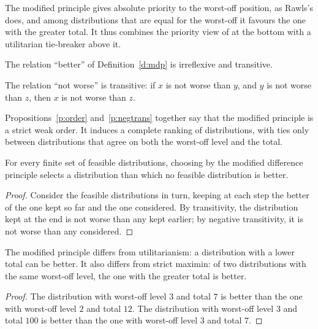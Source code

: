 \documentclass{situationist-preprint}
\begin{document}
The modified principle gives absolute priority to the worst-off position, as Rawls's does, and among distributions that are equal for the worst-off it favours the one with the greater total. It thus combines the priority view of \citet{Parfit1997} at the bottom with a utilitarian tie-breaker above it.

\begin{proposition}\label{p:order}
The relation \enquote{better} of Definition~\ref{d:mdp} is irreflexive and transitive.
\end{proposition}

\begin{proposition}\label{p:negtrans}
The relation \enquote{not worse} is transitive: if $x$ is not worse than $y$, and $y$ is not worse than $z$, then $x$ is not worse than $z$.
\end{proposition}

Propositions~\ref{p:order} and~\ref{p:negtrans} together say that the modified principle is a strict weak order. It induces a complete ranking of distributions, with ties only between distributions that agree on both the worst-off level and the total.

\begin{theorem}\label{t:choice}
For every finite set of feasible distributions, choosing by the modified difference principle selects a distribution than which no feasible distribution is better.
\end{theorem}

\begin{proof}
Consider the feasible distributions in turn, keeping at each step the better of the one kept so far and the one considered. By transitivity, the distribution kept at the end is not worse than any kept earlier; by negative transitivity, it is not worse than any considered.
\end{proof}

\begin{proposition}\label{p:differs}
The modified principle differs from utilitarianism: a distribution with a lower total can be better. It also differs from strict maximin: of two distributions with the same worst-off level, the one with the greater total is better.
\end{proposition}

\begin{proof}
The distribution with worst-off level $3$ and total $7$ is better than the one with worst-off level $2$ and total $12$. The distribution with worst-off level $3$ and total $100$ is better than the one with worst-off level $3$ and total $7$.
\end{proof}
\end{document}
